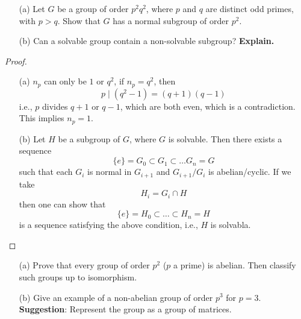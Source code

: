 \documentclass[openany]{book}
\begin{document}
\begin{prob}
    \begin{itemize}
        \item[(a)] Let \(G\) be a group of order \(p^2q^2\), where \(p\) and \(q\) are distinct odd primes, with \(p > q\). Show that \(G\) has a normal subgroup of order \(p^2\).
        \item[(b)] Can a solvable group contain a non-solvable subgroup? \textbf{Explain.}
    \end{itemize}
\end{prob}
\begin{proof}
    \begin{itemize}
        \item[(a)] $n_p$ can only be $1$ or $q^2$, if $n_p=q^2$, then
        \begin{equation*}
            p\mid (q^2-1)=(q+1)(q-1)
        \end{equation*}
        i.e., $p$ divides $q+1$ or $q-1$, which are both even, which is a contradiction. This implies $n_p=1$.
        \item[(b)] Let $H$ be a subgroup of $G$, where $G$ is solvable. Then there exists a sequence 
        \begin{equation*}
            \{e\}=G_0\subset G_1\subset\dots G_n=G
        \end{equation*}
        such that each $G_i$ is normal in $G_{i+1}$ and $G_{i+1}/G_i$ is abelian/cyclic. If we take 
        \begin{equation*}
            H_i=G_i\cap H
        \end{equation*}
        then one can show that 
        \begin{equation*}
            \{e\}=H_0\subset\dots\subset H_n=H
        \end{equation*}
        is a sequence satisfying the above condition, i.e., $H$ is solvabla.
    \end{itemize}
\end{proof}



\begin{prob}
    \begin{itemize}
        \item[(a)] Prove that every group of order \(p^2\) (\(p\) a prime) is abelian. Then classify such groups up to isomorphism.
        \item[(b)] Give an example of a non-abelian group of order \(p^3\) for \(p = 3\). \textbf{Suggestion}: Represent the group as a group of matrices.
    \end{itemize}
\end{prob}
\end{document}
